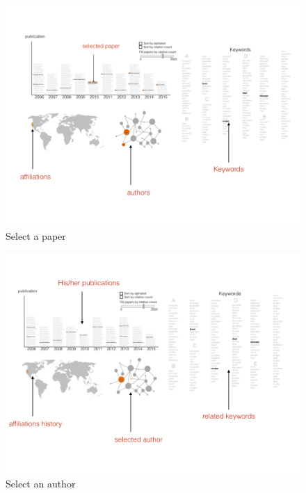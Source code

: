 \begin{figure}[htb!]
    \centering
    \includegraphics[width=160mm]{visproposalDrawing_page_Part_3.pdf}
    \caption{Select a paper}
    \label{fig:select_paper}
\end{figure}

\begin{figure}[htb!]
    \centering
    \includegraphics[width=160mm]{visproposalDrawing_page_Part_5.pdf}
    \caption{Select an author}
    \label{fig:select_author}
\end{figure}

